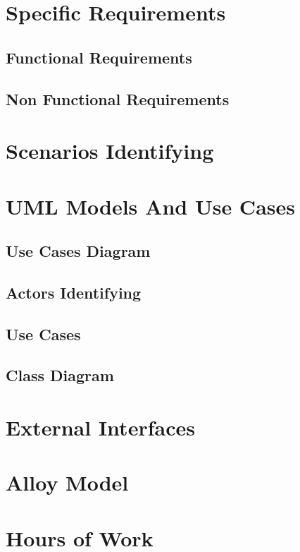 \documentclass[english]{article}
\begin{document}
\section{Specific Requirements}
	\subsection{Functional Requirements}
	\subsection{Non Functional Requirements}

\section{Scenarios Identifying}
\section{UML Models And Use Cases}
	\subsection{Use Cases Diagram}
	\subsection{Actors Identifying}
	\subsection{Use Cases}

	\subsection{Class Diagram}
\section{External Interfaces}
\section{Alloy Model}
\section{Hours of Work}
\end{document}
